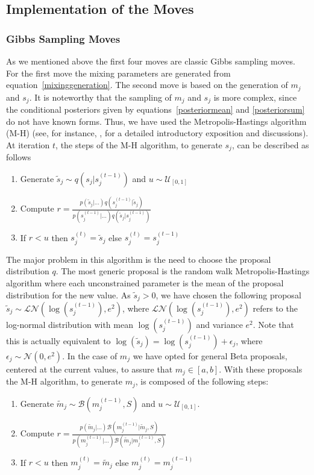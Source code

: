 \documentclass[journal,10pt]{elsart}
\begin{document}
\subsection{Implementation of the Moves}
\subsubsection{Gibbs Sampling Moves}
As we mentioned above the first four moves are classic Gibbs sampling moves. For the first move the mixing parameters are generated from equation~\ref{mixinggeneration}.
The second move is based on the generation of $m_j$ and $s_j$. It is noteworthy that the sampling of $m_j$ and $s_j$ is more complex,
since the conditional posteriors given by equations~\ref{posteriormean} and \ref{posteriorsum} do not have known forms.
Thus, we have used the Metropolis-Hastings algorithm (M-H)  (see, for instance, \cite{Chib1995}, for a detailed introductory exposition and discussions).
At iteration $t$, the steps of the M-H algorithm, to generate ${s}_j$, can be described as follows
\begin{enumerate}
    \item Generate $\tilde{s}_j \sim
    q({s}_j|{s}_j^{(t-1)})$ and $u \sim \mathcal{U}_{[0,1]}$
    \item Compute $r=\frac{p(\tilde{{s}}_j|\ldots)q({{s}}_j^{(t-1)}|\tilde{{s}}_j)}{p({s}_j^{(t-1)}|\ldots)q(\tilde{{s}}_j|{{s}}_j^{(t-1)})}$
    \item If $r < u$ then
    ${s}_j^{(t)}=\tilde{{s}}_j$ else
    ${s}_j^{(t)}={s}_j^{(t-1)}$
\end{enumerate}
The major problem in this algorithm is the need to choose the
proposal distribution $q$. The most generic proposal is the random
walk Metropolis-Hastings algorithm where each unconstrained
parameter is the mean of the proposal distribution for the new
value. As $\tilde{s}_{j} >0$, we have chosen the
following proposal $\tilde{{s}}_j \sim \mathcal{L}\mathcal{N}(\log({s}_j^{(t-1)}),e^2)$,
where $\mathcal{L}\mathcal{N}(\log({s}_j^{(t-1)}),e^2)$
refers to the log-normal distribution with mean
$\log({s}_j^{(t-1)})$ and variance $e^2$. Note that this is actually equivalent
to $\log(\tilde{s}_{j})=
\log(s_{j}^{(t-1)})+\epsilon_{j}$,
where $\epsilon_{j} \sim \mathcal{N}(0,e^2)$. In the case of $m_{j}$ we have opted for general Beta proposals, centered at the current values, to assure that $m_{j} \in [a,b]$. With
these proposals the  M-H algorithm, to generate $m_{j}$, is composed of the
following steps:
\begin{enumerate}
    \item Generate $\tilde{{m}}_{j}\sim
\mathcal{B}({m}_{j}^{{(t-1)}},S)$ and $u
\sim
    \mathcal{U}_{[0,1]}$.
    \item Compute $r=\frac{p({\tilde{m}}_{j}|\ldots)
\mathcal{B}({m}_{j}^{{(t-1)}}|{\tilde{m}}_{j},S)}{p(m_{j}^{(t-1)}|\ldots)\mathcal{B}(\tilde{m}_{j}|{m}_{j}^{{(t-1)}},S)}$
    \item If $r < u$ then
    ${m}_{j}^{{(t)}}={\tilde{m}}_{j}$ else
    ${m}_{j}^{{(t)}}={m}_{j}^{{(t-1)}}$
\end{enumerate}
\end{document}
